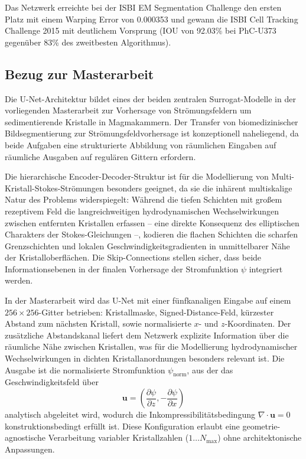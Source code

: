 \documentclass[a4paper,12pt]{article}
\begin{document}
Das Netzwerk erreichte bei der ISBI EM Segmentation Challenge den ersten Platz mit einem Warping Error von 0.000353 und gewann die ISBI Cell Tracking Challenge 2015 mit deutlichem Vorsprung (IOU von 92.03\% bei PhC-U373 gegenüber 83\% des zweitbesten Algorithmus).

\subsection*{Bezug zur Masterarbeit}

Die U-Net-Architektur bildet eines der beiden zentralen Surrogat-Modelle in der vorliegenden Masterarbeit zur Vorhersage von Strömungsfeldern um sedimentierende Kristalle in Magmakammern. Der Transfer von biomedizinischer Bildsegmentierung zur Strömungsfeldvorhersage ist konzeptionell naheliegend, da beide Aufgaben eine strukturierte Abbildung von räumlichen Eingaben auf räumliche Ausgaben auf regulären Gittern erfordern.

Die hierarchische Encoder-Decoder-Struktur ist für die Modellierung von Multi-Kristall-Stokes-Strömungen besonders geeignet, da sie die inhärent multiskalige Natur des Problems widerspiegelt: Während die tiefen Schichten mit großem rezeptivem Feld die langreichweitigen hydrodynamischen Wechselwirkungen zwischen entfernten Kristallen erfassen -- eine direkte Konsequenz des elliptischen Charakters der Stokes-Gleichungen --, kodieren die flachen Schichten die scharfen Grenzschichten und lokalen Geschwindigkeitsgradienten in unmittelbarer Nähe der Kristalloberflächen. Die Skip-Connections stellen sicher, dass beide Informationsebenen in der finalen Vorhersage der Stromfunktion $\psi$ integriert werden.

In der Masterarbeit wird das U-Net mit einer fünfkanaligen Eingabe auf einem $256 \times 256$-Gitter betrieben: Kristallmaske, Signed-Distance-Feld, kürzester Abstand zum nächsten Kristall, sowie normalisierte $x$- und $z$-Koordinaten. Der zusätzliche Abstandskanal liefert dem Netzwerk explizite Information über die räumliche Nähe zwischen Kristallen, was für die Modellierung hydrodynamischer Wechselwirkungen in dichten Kristallanordnungen besonders relevant ist. Die Ausgabe ist die normalisierte Stromfunktion $\psi_{\text{norm}}$, aus der das Geschwindigkeitsfeld über
\begin{equation}
    \mathbf{u} = \left(\frac{\partial \psi}{\partial z}, -\frac{\partial \psi}{\partial x}\right)
\end{equation}
analytisch abgeleitet wird, wodurch die Inkompressibilitätsbedingung $\nabla \cdot \mathbf{u} = 0$ konstruktionsbedingt erfüllt ist. Diese Konfiguration erlaubt eine geometrie-agnostische Verarbeitung variabler Kristallzahlen ($1 \ldots N_{\text{max}}$) ohne architektonische Anpassungen.
\end{document}

